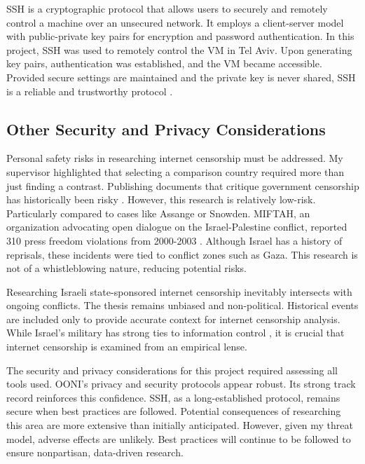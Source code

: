 SSH is a cryptographic protocol that allows users to securely and remotely control a machine over an unsecured network. It employs a client-server model with public-private key pairs for encryption and password authentication. In this project, SSH was used to remotely control the VM in Tel Aviv. Upon generating key pairs, authentication was established, and the VM became accessible. Provided secure settings are maintained and the private key is never shared, SSH is a reliable and trustworthy protocol \cite{SSHManual}.

\subsection{Other Security and Privacy Considerations}
Personal safety risks in researching internet censorship must be addressed. My supervisor highlighted that selecting a comparison country required more than just finding a contrast. Publishing documents that critique government censorship has historically been risky \cite{JulianAssange, EdwardSnowden}. However, this research is relatively low-risk. Particularly compared to cases like Assange or Snowden. MIFTAH, an organization advocating open dialogue on the Israel-Palestine conflict, reported 310 press freedom violations from 2000-2003 \cite{MIFTAHReport2003}. Although Israel has a history of reprisals, these incidents were tied to conflict zones such as Gaza. This research is not of a whistleblowing nature, reducing potential risks.

Researching Israeli state-sponsored internet censorship inevitably intersects with ongoing conflicts. The thesis remains unbiased and non-political. Historical events are included only to provide accurate context for internet censorship analysis. While Israel’s military has strong ties to information control \cite{IsraelCensorship}, it is crucial that internet censorship is examined from an empirical lense.

The security and privacy considerations for this project required assessing all tools used. OONI’s privacy and security protocols appear robust. Its strong track record reinforces this confidence. SSH, as a long-established protocol, remains secure when best practices are followed. Potential consequences of researching this area are more extensive than initially anticipated. However, given my threat model, adverse effects are unlikely. Best practices will continue to be followed to ensure nonpartisan, data-driven research.